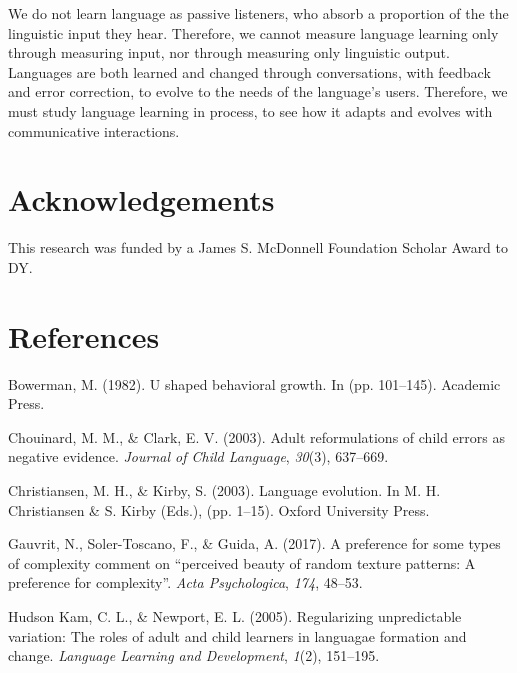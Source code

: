 \documentclass[10pt, letterpaper]{article}
\begin{document}
We do not learn language as passive listeners, who absorb a proportion
of the the linguistic input they hear. Therefore, we cannot measure
language learning only through measuring input, nor through measuring
only linguistic output. Languages are both learned and changed through
conversations, with feedback and error correction, to evolve to the
needs of the language's users. Therefore, we must study language
learning in process, to see how it adapts and evolves with communicative
interactions.

\vspace{1em}

\section{Acknowledgements}\label{acknowledgements}

This research was funded by a James S. McDonnell Foundation Scholar
Award to DY.

\section{References}\label{references}

\setlength{\parindent}{-0.1in} \setlength{\leftskip}{0.125in}

\noindent

\hypertarget{refs}{}
\hypertarget{ref-bowerman-1982}{}
Bowerman, M. (1982). U shaped behavioral growth. In (pp. 101--145).
Academic Press.

\hypertarget{ref-chouinard-2003}{}
Chouinard, M. M., \& Clark, E. V. (2003). Adult reformulations of child
errors as negative evidence. \emph{Journal of Child Language},
\emph{30}(3), 637--669.

\hypertarget{ref-christiansen-2003}{}
Christiansen, M. H., \& Kirby, S. (2003). Language evolution. In M. H.
Christiansen \& S. Kirby (Eds.), (pp. 1--15). Oxford University Press.

\hypertarget{ref-gauvrit-2017}{}
Gauvrit, N., Soler-Toscano, F., \& Guida, A. (2017). A preference for
some types of complexity comment on ``perceived beauty of random texture
patterns: A preference for complexity''. \emph{Acta Psychologica},
\emph{174}, 48--53.

\hypertarget{ref-hudsonkam-2005}{}
Hudson Kam, C. L., \& Newport, E. L. (2005). Regularizing unpredictable
variation: The roles of adult and child learners in languagae formation
and change. \emph{Language Learning and Development}, \emph{1}(2),
151--195.
\end{document}

